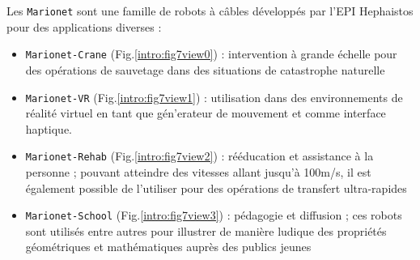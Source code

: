Les {\tt Marionet} sont une famille de robots à câbles développés par l'EPI 
Hephaistos pour des applications diverses \cite{merlet2010marionet} :
\begin{itemize}
 \item {\tt Marionet-Crane} (Fig.\ref{intro:fig7view0}) : intervention à grande 
échelle pour des opé\-rations de sauvetage dans des situations de catastrophe 
naturelle
 \item {\tt Marionet-VR} (Fig.\ref{intro:fig7view1}) : utilisation dans des 
environnements de r\'ealit\'e virtuel en tant que g\'en'erateur de mouvement et 
comme interface haptique. 
 \item {\tt Marionet-Rehab} (Fig.\ref{intro:fig7view2}) : rééducation et 
assistance à la personne ; pouvant atteindre des vitesses allant jusqu'à 
100m/s, il est également possible de l'utiliser pour des opérations de 
transfert ultra-rapides
 \item {\tt Marionet-School} (Fig.\ref{intro:fig7view3}) : pédagogie et 
diffusion ; ces robots sont utilisés entre autres pour illustrer de manière 
ludique des propriétés géomé\-triques et mathématiques auprès des publics jeunes
\end{itemize}

